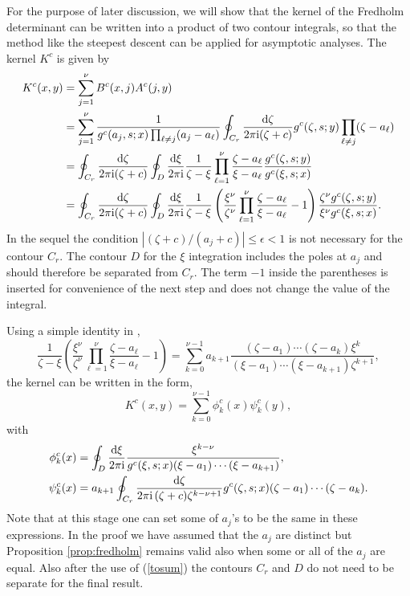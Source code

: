 \documentclass[cmp]{svjour}
\numberwithin{theorem}{section}
\numberwithin{equation}{section}
\def\dd{{\rm d}}
\def\ii{{\rm i}}
\begin{document}
For the purpose of later discussion, we will show that the kernel of the Fredholm determinant can be written into a product of two contour integrals, so that the method like the steepest descent can be applied for asymptotic analyses. The kernel $K^c$ is given by
\begin{align}
\nonumber
K^c(x,y)
&=
\sum_{j=1}^\nu B^c(x,j)A^c(j,y)
\\
\nonumber
&=
\sum_{j=1}^\nu \frac{1}{g^c(a_j, s ; x )
\prod_{\ell \neq j} (a_j-a_\ell)}
\oint_{C_r} \frac{\dd \zeta}{2\pi \ii ( \zeta +c ) } g^c(\zeta, s ; y )
\prod_{\ell\neq j} (\zeta-a_{\ell})
\\
&=
\oint_{C_r} \frac{\dd \zeta}{2\pi \ii ( \zeta +c )} \oint_D \frac{\dd \xi}{2\pi\ii} \frac{1}{\zeta-\xi}
\prod_{\ell=1}^\nu \frac{\zeta-a_\ell}{\xi-a_\ell} \frac{g^c(\zeta, s; y )}{g^c(\xi,  s ; x )} 
\label{kernel form 2}
\\
\nonumber
&=
\oint_{C_r} \frac{\dd \zeta}{2\pi \ii ( \zeta +c )} \oint_D \frac{\dd \xi}{2\pi\ii} \frac{1}{\zeta-\xi}\left(\frac{\xi^{\nu}}{\zeta^{\nu}}\prod_{\ell=1}^\nu \frac{\zeta-a_\ell}{\xi-a_\ell}-1\right) 
\frac{\zeta^{\nu}g^c(\zeta, s ; y )}{\xi^{\nu}g^c(\xi, s ; x )} .
\end{align}
In the sequel the condition $|(\zeta +c) /(a_j +c )|\le \epsilon<1$ is not 
necessary for the contour $C_r$. 
The contour $D$ for the $\xi$ integration includes the poles at $a_j$ and should therefore be separated from $C_r$. The term $-1$ inside the parentheses is inserted for convenience of the next step and does not change the value of the integral.

Using a simple identity in \cite{IS2019},
\begin{equation}
\frac{1}{\zeta-\xi}
\left(\frac{\xi^\nu}{\zeta^\nu}\prod_{\ell=1}^\nu \frac{\zeta-a_\ell}{\xi-a_\ell}-1\right)
=
\sum_{k=0}^{\nu-1} a_{k+1}\frac{(\zeta-a_1)\cdots (\zeta-a_k)\xi^k}{(\xi-a_1)\cdots (\xi-a_{k+1})\zeta^{k+1}},
\label{tosum}
\end{equation}
the kernel can be written in the form,
\begin{equation}
\label{kernel form summation}
 K^c(x,y) = \sum_{k=0}^{\nu-1} \phi^c_k(x) \psi^c_k(y),
\end{equation}
with
\begin{align}
\phi^c_k(x)
&=
\oint_D \frac{\dd \xi}{2\pi\ii}
\frac{\xi^{k-\nu}}{ g^c(\xi, s ; x )
(\xi-a_1)\cdots (\xi-a_{k+1})} ,
\label{phi}
\\
\psi^c_k(x)
&=
a_{k+1} \oint_{C_r} \frac{\dd \zeta}{2\pi\ii\, (\zeta + c) \zeta^{k-\nu+1}}
g^c(\zeta, s ; x )(\zeta-a_1)\cdots (\zeta-a_k) 
\label{psi}.
\end{align}
Note that at this stage one can set some of $a_j$'s to be the same in these expressions. In the proof we have assumed that the $a_j$ are distinct but Proposition \ref{prop:fredholm} remains valid also when some or all of the $a_j$ are equal. Also after the use of (\ref{tosum}) the contours $C_r$ and $D$ do not need to be separate for the final result.
 
\end{document}
